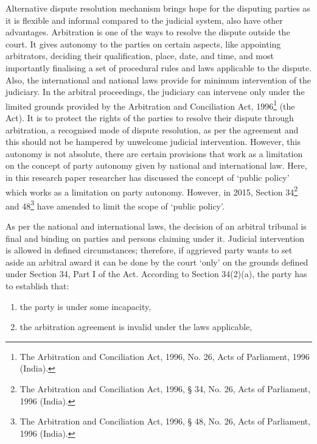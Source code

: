 \begin{multicols}{2}
\noi
Alternative dispute resolution mechanism brings hope for the disputing parties as it is flexible
and informal compared to the judicial system, also have other advantages. Arbitration is one
of the ways to resolve the dispute outside the court. It gives autonomy to the parties on certain
aspects, like appointing arbitrators, deciding their qualification, place, date, and time, and most
importantly finalising a set of procedural rules and laws applicable to the dispute. Also, the
international and national laws provide for minimum intervention of the judiciary. In the
arbitral proceedings, the judiciary can intervene only under the limited grounds provided by
the Arbitration and Conciliation Act, 1996\footnote{The Arbitration and Conciliation Act, 1996, No. 26, Acts of Parliament, 1996 (India).}  (the Act). It is to protect the rights of the parties
to resolve their dispute through arbitration, a recognised mode of dispute resolution, as per the
agreement and this should not be hampered by unwelcome judicial intervention. However,
this autonomy is not absolute, there are certain provisions that work as a limitation on the
concept of party autonomy given by national and international law. Here, in this research paper
researcher has discussed the concept of ‘public policy’ which works as a limitation on party
autonomy. However, in 2015, Section 34\footnote{The Arbitration and Conciliation Act, 1996, § 34, No. 26, Acts of Parliament, 1996 (India).} and 48\footnote{The Arbitration and Conciliation Act, 1996, § 48, No. 26, Acts of Parliament, 1996 (India).} have amended to limit the scope of ‘public policy’.


\noi
As per the national and international laws, the decision of an arbitral tribunal is final and
binding on parties and persons claiming under it. Judicial intervention is allowed in defined
circumstances; therefore, if aggrieved party wants to set aside an arbitral award it can be done
by the court ‘only’ on the grounds defined under Section 34, Part I of the Act. According to
Section 34(2)(a), the party has to establish that:

\vspace{-.4cm}

\begin{enumerate}[label=$\alph*.$]
\itemsep=0pt
\item the party is under some incapacity,

\item the arbitration agreement is invalid under the laws applicable,


\end{enumerate}
\end{multicols}
